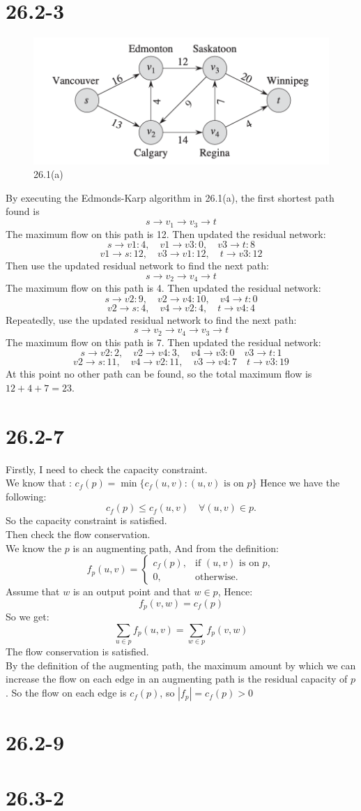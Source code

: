 \documentclass[12pt]{article}
\begin{document}
\section{26.2-3}
\begin{figure}[h]
    \centering
    \includegraphics[width=0.5\linewidth]{截屏2024-11-18 下午8.43.56.png}
    \caption{26.1(a)}
    \label{fig:26.1(a)}
\end{figure}
By executing the Edmonds-Karp algorithm in 26.1(a), the first shortest path found is 
\[s \rightarrow v_1 \rightarrow v_3 \rightarrow t\]
The maximum flow on this path is 12.
Then updated the residual network:
\[s \rightarrow v1: 4, \quad v1 \rightarrow v3: 0, \quad v3 \rightarrow t: 8\]
\[v1 \rightarrow s: 12, \quad v3 \rightarrow v1: 12, \quad t \rightarrow v3: 12\]
Then use the updated residual network to find the next path:
\[s  \rightarrow v_2 \rightarrow v_4 \rightarrow t\]
The maximum flow on this path is 4.
Then updated the residual network:
\[s \rightarrow v2: 9, \quad v2 \rightarrow v4: 10, \quad v4 \rightarrow t: 0 \]
\[v2 \rightarrow s: 4, \quad v4 \rightarrow v2: 4, \quad t \rightarrow v4: 4 \]
Repeatedly, use the updated residual network to find the next path:
\[s \rightarrow v_2 \rightarrow v_4  \rightarrow v_3 \rightarrow t\]
The maximum flow on this path is 7.
Then updated the residual network:
\[s \rightarrow v2: 2, \quad v2 \rightarrow v4: 3, \quad v4 \rightarrow v3: 0 \quad v3 \rightarrow t: 1\]
\[v2 \rightarrow s: 11, \quad v4 \rightarrow v2: 11, \quad v3 \rightarrow v4: 7 \quad t \rightarrow v3: 19\]
At this point no other path can be found, so the total maximum flow is \(12+4+7=23\).
\section{26.2-7}
Firstly, I need to check the capacity constraint.\\
We know that : \(c_f(p) = \min \{ c_f(u, v) : (u, v) \text{ is on } p \}\)
Hence we have the following:
\[c_f(p) \leq c_f(u, v) \quad \forall (u, v) \in p.\]
So the capacity constraint is satisfied.\\
Then check the flow conservation.\\
We know the \(p\) is an augmenting path, And from the definition:
\[f_p(u, v) =
\begin{cases} 
c_f(p), & \text{if } (u, v) \text{ is on } p, \\ 
0, & \text{otherwise}.
\end{cases}\]
Assume that \(w\) is an output point and that \(w \in p\), Hence:
\[f_p(v, w) = c_f(p)\]
So we get: 
\[\sum_{u \in p} f_p(u, v) =\sum_{w \in p} f_p(v, w)\]
The flow conservation is satisfied.\\
By the definition of the augmenting path, the maximum amount by which we can increase the flow on each edge in an augmenting path is the residual capacity of \(p\).
So the flow on each edge is \(c_f(p)\), so \( |f_p| = c_f(p)> 0\)
\section{26.2-9}
\section{26.3-2}
\end{document}
